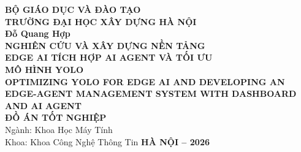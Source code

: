 \hypersetup{pageanchor=false}
\begin{titlepage}
\begin{center}
{\large\bfseries BỘ GIÁO DỤC VÀ ĐÀO TẠO}\\[2pt]
{\large\bfseries TRƯỜNG ĐẠI HỌC XÂY DỰNG HÀ NỘI}\\[3cm]
{\large\bfseries Đỗ Quang Hợp}\\[2cm]
{\LARGE\bfseries NGHIÊN CỨU VÀ XÂY DỰNG NỀN TẢNG\\[4pt]
EDGE AI TÍCH HỢP AI AGENT VÀ TỐI ƯU\\[4pt] MÔ HÌNH YOLO}\\[1cm]
{\large\bfseries OPTIMIZING YOLO FOR EDGE AI AND DEVELOPING AN EDGE-AGENT
MANAGEMENT SYSTEM WITH DASHBOARD AND AI AGENT}\\[2cm]
{\Large\bfseries ĐỒ ÁN TỐT NGHIỆP}\\[1.5cm]
{\large Ngành: Khoa Học Máy Tính}\\[2pt]
{\large Khoa: Khoa Công Nghệ Thông Tin}
\vfill
{\large\bfseries HÀ NỘI -- 2026}
\end{center}
\end{titlepage}
